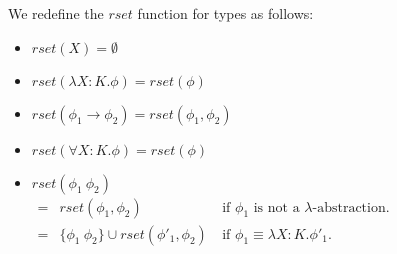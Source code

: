\noindent
We redefine the $rset$ function for types as follows:
\begin{center}
    \begin{itemize}
    \item[] $rset(X) = \emptyset$\\
    \item[] $rset(\lambda X:K.\phi) = rset(\phi)$\\
    \item[] $rset(\phi_1 \to \phi_2) = rset(\phi_1,\phi_2)$\\
    \item[] $rset(\forall X:K.\phi) = rset(\phi)$\\
    \item[] $rset(\phi_1\ \phi_2)$\\
      \begin{math}
        \begin{array}{lll}
          = & rset(\phi_1, \phi_2) & \text{if } \phi_1 \text{ is not a } \lambda \text{-abstraction.}\\
          = & \{\phi_1\ \phi_2\} \cup rset(\phi'_1, \phi_2)\ & \text{if } \phi_1 \equiv \lambda X:K.\phi'_1.\\
        \end{array}
      \end{math}
    \end{itemize}
  \end{center}

